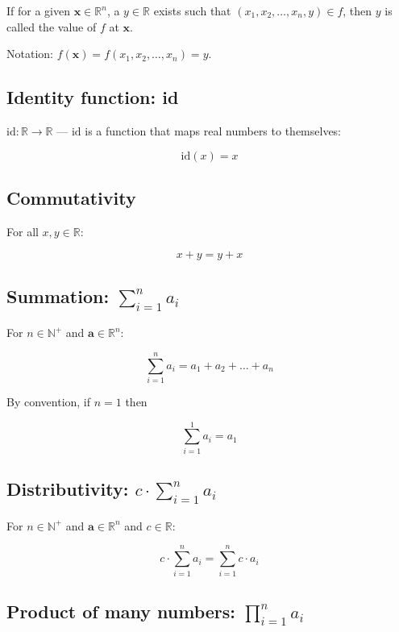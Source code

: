 \documentclass[titlepage]{article}
\begin{document}
            If for a given $\mathbf{x} \in \mathbb{R}^n$, a $y \in \mathbb{R}$
            exists such that $(x_1, x_2, \dots, x_n, y) \in f$, then $y$ is
            called the value of $f$ at $\mathbf{x}$.

            Notation: $f(\mathbf{x}) = f(x_1, x_2, \ldots, x_n) = y$.

      \subsection{Identity function: id}

        $\text{id} : \mathbb{R} \rightarrow \mathbb{R}$ --- $\text{id}$ is a
        function that maps real numbers to themselves:

        $$\text{id}(x) = x$$

      \subsection{Commutativity}

        For all $x, y \in \mathbb{R}$:

        $$x + y = y + x$$

      \subsection{Summation: $\sum_{i=1}^n a_i$}

        For $n \in \mathbb{N}^+$ and $\mathbf{a} \in \mathbb{R}^n$:

        $$\sum_{i=1}^n a_i = a_1 + a_2 + \ldots + a_n$$

        By convention, if $n=1$ then

        $$\sum_{i=1}^1 a_i = a_1$$

      \subsection{Distributivity: $c \cdot \sum_{i=1}^n a_i$}

        For $n \in \mathbb{N}^+$ and $\mathbf{a} \in \mathbb{R}^n$ and
        $c \in \mathbb{R}$:

        $$c \cdot \sum_{i=1}^n a_i = \sum_{i=1}^n c \cdot a_i$$

      \subsection{Product of many numbers: $\prod_{i=1}^n a_i$}
\end{document}
